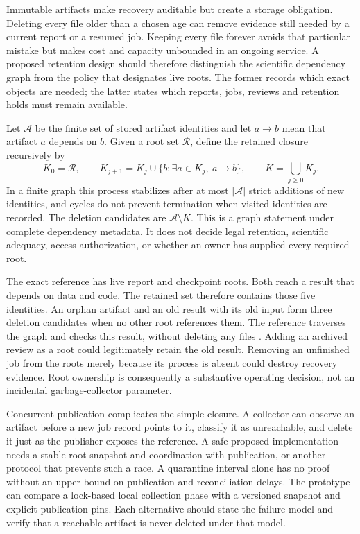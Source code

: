 Immutable artifacts make recovery auditable but create a storage obligation.
Deleting every file older than a chosen age can remove evidence still needed
by a current report or a resumed job. Keeping every file forever avoids that
particular mistake but makes cost and capacity unbounded in an ongoing
service. A proposed retention design should therefore distinguish the
scientific dependency graph from the policy that designates live roots.
The former records which exact objects are needed; the latter states which
reports, jobs, reviews and retention holds must remain available.

Let $\mathcal A$ be the finite set of stored artifact identities and let
$a\to b$ mean that artifact $a$ depends on $b$. Given a root set
$\mathcal R$, define the retained closure recursively by
\begin{equation}
 K_0=\mathcal R,\qquad
 K_{j+1}=K_j\cup\{b:\exists a\in K_j,\ a\to b\},\qquad
 K=\bigcup_{j\geq0}K_j.
 \label{exec17:i4-reachability}
\end{equation}
In a finite graph this process stabilizes after at most $|\mathcal A|$
strict additions of new identities, and cycles do not prevent termination
when visited identities are recorded. The deletion candidates are
$\mathcal A\setminus K$. This is a graph statement under complete dependency
metadata. It does not decide legal retention, scientific adequacy, access
authorization, or whether an owner has supplied every required root.

The exact reference has live report and checkpoint roots. Both reach a result
that depends on data and code. The retained set therefore contains those
five identities. An orphan artifact and an old result with its old input
form three deletion candidates when no other root references them.
The reference traverses the graph and checks this result, without deleting
any files \citep{exec17_integration_review_reference}. Adding an archived
review as a root could legitimately retain the old result. Removing an
unfinished job from the roots merely because its process is absent could
destroy recovery evidence. Root ownership is consequently a substantive
operating decision, not an incidental garbage-collector parameter.

Concurrent publication complicates the simple closure. A collector can
observe an artifact before a new job record points to it, classify it as
unreachable, and delete it just as the publisher exposes the reference.
A safe proposed implementation needs a stable root snapshot and coordination
with publication, or another protocol that prevents such a race. A
quarantine interval alone has no proof without an upper bound on publication
and reconciliation delays. The prototype can compare a lock-based local
collection phase with a versioned snapshot and explicit publication pins.
Each alternative should state the failure model and verify that a reachable
artifact is never deleted under that model.

